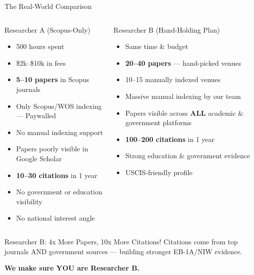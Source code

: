 \documentclass[10pt, aspectratio=169]{beamer}
\begin{document}
	\begin{frame}{The Real-World Comparison}
		\begin{columns}[T]
			\begin{block}{\textcolor{myred}{Researcher A (Scopus-Only)}}
				\begin{itemize}
					\item 500 hours spent
					\item \$2k–\$10k in fees
					\item \textbf{5–10 papers} in Scopus journals
					\item Only \textcolor{myred}{Scopus/WOS indexing — Paywalled}
					\item \textcolor{myred}{No manual indexing support}
					\item Papers poorly visible in Google Scholar
					\item \textbf{\textcolor{myred}{10–30 citations}} in 1 year
					\item No government or education visibility
					\item No national interest angle
				\end{itemize}
			\end{block}
			
			\begin{block}{\textcolor{myblue}{Researcher B (Hand-Holding Plan)}}
				\begin{itemize}
					\item Same time \& budget
					\item \textbf{20–40 papers} — hand-picked venues
					\item \textcolor{mygreen}{10–15 manually indexed venues}
					\item \textcolor{mygreen}{Massive manual indexing by our team}
					\item Papers visible across \textbf{ALL} academic \& government platforms
					\item \textbf{\textcolor{myblue}{100–200 citations}} in 1 year
					\item Strong education \& government evidence
					\item \textcolor{mygreen}{USCIS-friendly profile}
				\end{itemize}
			\end{block}
		\end{columns}
		
		\vspace{0.3cm}
		\begin{center}
			
			\vspace{0.2cm}
			\tiny{Researcher B: 4x More Papers, 10x More Citations! Citations come from top journals AND government sources — building stronger EB-1A/NIW evidence.}
			
			\vspace{0.2cm}
			\textcolor{myblue}{\textbf{We make sure YOU are Researcher B.}}
		\end{center}
	\end{frame}
	
\end{document}

